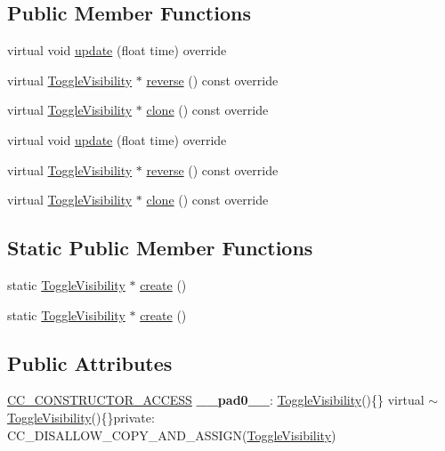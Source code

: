 \subsection*{Public Member Functions}
\begin{DoxyCompactItemize}
\item 
virtual void \hyperlink{classToggleVisibility_a7a00173aaded366259698c37ebbb2ca0}{update} (float time) override
\item 
virtual \hyperlink{classToggleVisibility}{Toggle\+Visibility} $\ast$ \hyperlink{classToggleVisibility_a4904108887e11c98fd1d536bb76b2d35}{reverse} () const override
\item 
virtual \hyperlink{classToggleVisibility}{Toggle\+Visibility} $\ast$ \hyperlink{classToggleVisibility_a6a9b7e14c73ee877b9f4b29af4f7f5aa}{clone} () const override
\item 
virtual void \hyperlink{classToggleVisibility_a2d217511fd3f28ee096e0de1aacf21b4}{update} (float time) override
\item 
virtual \hyperlink{classToggleVisibility}{Toggle\+Visibility} $\ast$ \hyperlink{classToggleVisibility_aa406922563a2c5790e580653bc16c29e}{reverse} () const override
\item 
virtual \hyperlink{classToggleVisibility}{Toggle\+Visibility} $\ast$ \hyperlink{classToggleVisibility_ab1ce8f24f1840b08c9146b462a7810b2}{clone} () const override
\end{DoxyCompactItemize}
\subsection*{Static Public Member Functions}
\begin{DoxyCompactItemize}
\item 
static \hyperlink{classToggleVisibility}{Toggle\+Visibility} $\ast$ \hyperlink{classToggleVisibility_a94c07c1f0644b5c17f540016e6311303}{create} ()
\item 
static \hyperlink{classToggleVisibility}{Toggle\+Visibility} $\ast$ \hyperlink{classToggleVisibility_a03f7c838b5c70cc4239eafeb42e9ed41}{create} ()
\end{DoxyCompactItemize}
\subsection*{Public Attributes}
\begin{DoxyCompactItemize}
\item 
\mbox{\label{classToggleVisibility_a3e960055d2f6de29d9b3a5a8dd79496b}} 
\hyperlink{_2cocos2d_2cocos_2base_2ccConfig_8h_a25ef1314f97c35a2ed3d029b0ead6da0}{C\+C\+\_\+\+C\+O\+N\+S\+T\+R\+U\+C\+T\+O\+R\+\_\+\+A\+C\+C\+E\+SS} {\bfseries \+\_\+\+\_\+pad0\+\_\+\+\_\+}\+: \hyperlink{classToggleVisibility}{Toggle\+Visibility}()\{\} virtual $\sim$\hyperlink{classToggleVisibility}{Toggle\+Visibility}()\{\}private\+: C\+C\+\_\+\+D\+I\+S\+A\+L\+L\+O\+W\+\_\+\+C\+O\+P\+Y\+\_\+\+A\+N\+D\+\_\+\+A\+S\+S\+I\+GN(\hyperlink{classToggleVisibility}{Toggle\+Visibility})
\end{DoxyCompactItemize}
